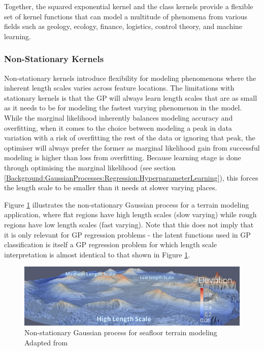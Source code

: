 				Together, the squared exponential kernel and the \matern class kernels provide a flexible set of kernel functions that can model a multitude of phenomena from various fields such as geology, ecology, finance, logistics, control theory, and machine learning.
			
			\subsubsection{Non-Stationary Kernels}
			\label{Background:GaussianProcesses:KernelFunctions:Nonstationary}
			
				Non-stationary kernels introduce flexibility for modeling phenomenons where the inherent length scales varies across feature locations. The limitations with stationary kernels is that the GP will always learn length scales that are as small as it needs to be for modeling the fastest varying phenomenon in the model. While the marginal likelihood inherently balances modeling accuracy and overfitting, when it comes to the choice between modeling a peak in data variation with a risk of overfitting the rest of the data or ignoring that peak, the optimiser will always prefer the former as marginal likelihood gain from successful modeling is higher than loss from overfitting. Because learning stage is done through optimising the marginal likelihood (see section \ref{Background:GaussianProcesses:Regression:HyperparameterLearning}), this forces the length scale to be smaller than it needs at slower varying places.

				Figure \ref{Figure:GaussianProcessLengthScale} illustrates the non-stationary Gaussian process for a terrain modeling application, where flat regions have high length scales (slow varying) while rough regions have low length scales (fast varying). Note that this does not imply that it is only relevant for GP regression problems - the latent functions used in GP classification is itself a GP regression problem for which length scale interpretation is almost identical to that shown in Figure \ref{Figure:GaussianProcessLengthScale}.
				
				\begin{figure}[!htbp]
					\centering
						\includegraphics[width=\textwidth]{Figures/gaussianprocesslengthscale.png}
					\caption{Non-stationary Gaussian process for seafloor terrain modeling Adapted from \cite{ROB:ROB21403}}
					\label{Figure:GaussianProcessLengthScale}
				\end{figure}
				
